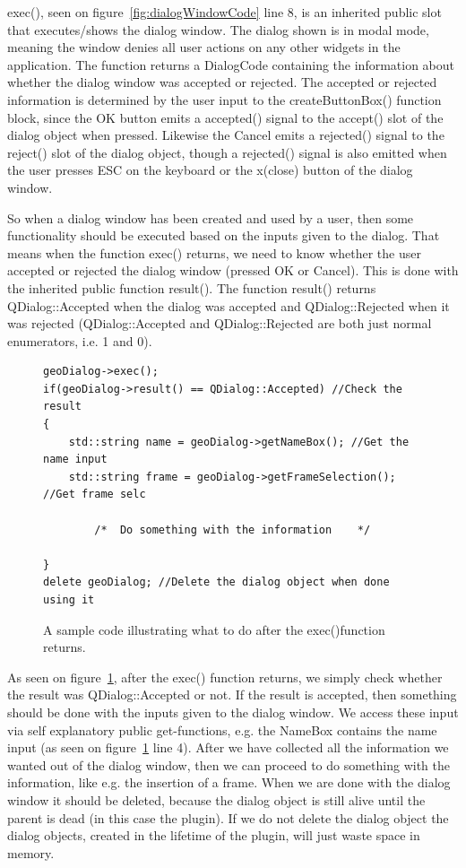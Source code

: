 exec(), seen on figure~\ref{fig:dialogWindowCode} line 8, is an inherited public slot that executes/shows the dialog window. The dialog shown is in modal mode, meaning the window denies all user actions on any other widgets in the application. The function returns a DialogCode containing the information about whether the dialog window was accepted or rejected. The accepted or rejected information is determined by the user input to the createButtonBox() function block, since the OK button emits a accepted() signal to the accept() slot of the dialog object when pressed. Likewise the Cancel emits a rejected() signal to the reject() slot of the dialog object, though a rejected() signal is also emitted when the user presses ESC on the keyboard or the x(close) button of the dialog window. 

So when a dialog window has been created and used by a user, then some functionality should be executed based on the inputs given to the dialog. That means when the function exec() returns, we need to know whether the user accepted or rejected the dialog window (pressed OK or Cancel). This is done with the inherited public function result(). The function result() returns QDialog::Accepted when the dialog was accepted and QDialog::Rejected when it was rejected (QDialog::Accepted and QDialog::Rejected are both just normal enumerators, i.e. 1 and 0). 

\begin{figure}[h] %
\centering
\lstset{language=C++} 
\begin{lstlisting}[frame=single]  
geoDialog->exec();
if(geoDialog->result() == QDialog::Accepted) //Check the result
{
	std::string name = geoDialog->getNameBox(); //Get the name input
	std::string frame = geoDialog->getFrameSelection(); //Get frame selc
											 
		/*	Do something with the information    */ 
		
}
delete geoDialog; //Delete the dialog object when done using it
\end{lstlisting}
\caption{A sample code illustrating what to do after the exec()function returns.}
\label{fig:dialogAcceptedRejectedCode} 	
\end{figure}

As seen on figure~\ref{fig:dialogAcceptedRejectedCode}, after the exec() function returns, we simply check whether the result was QDialog::Accepted or not. If the result is accepted, then something should be done with the inputs given to the dialog window. We access these input via self explanatory public get-functions, e.g. the NameBox contains the name input (as seen on figure~\ref{fig:dialogAcceptedRejectedCode} line 4). After we have collected all the information we wanted out of the dialog window, then we can proceed to do something with the information, like e.g. the insertion of a frame. When we are done with the dialog window it should be deleted, because the dialog object is still alive until the parent is dead (in this case the plugin). If we do not delete the dialog object the dialog objects, created in the lifetime of the plugin, will just waste space in memory. 

